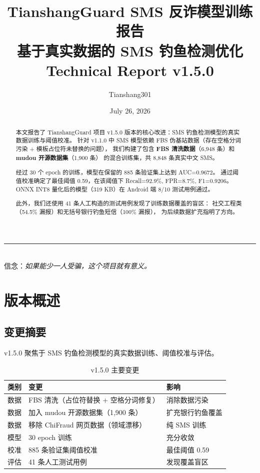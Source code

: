\documentclass[11pt,a4paper]{article}
\title{\vspace{-2cm}
  {\LARGE\bfseries\color{primaryblue} TianshangGuard SMS 反诈模型训练报告}\\[0.3cm]
  {\large 基于真实数据的 SMS 钓鱼检测优化}\\[0.2cm]
  {\normalsize Technical Report v1.5.0}
}
\author{Tianshang301}
\date{July 26, 2026}
\begin{document}
\maketitle
\thispagestyle{empty}

\begin{center}
\rule{0.618\textwidth}{0.5pt}\\[0.3cm]
{\small 信念：\textit{如果能少一人受骗，这个项目就有意义。}}
\end{center}

\vspace{0.5cm}

\begin{abstract}
本文报告了 TianshangGuard 项目 v1.5.0 版本的核心改进：SMS 钓鱼检测模型的真实数据训练与阈值校准。
针对 v1.1.0 中 SMS 模型依赖 FBS 伪基站数据（存在空格分词污染 + 模板占位符未替换的问题），
我们构建了包含 \textbf{FBS 清洗数据}（6,948 条）和 \textbf{mudou 开源数据集}（1,900 条）
的混合训练集，共 8,848 条真实中文 SMS。

经过 30 个 epoch 的训练，模型在保留的 885 条验证集上达到 AUC=0.9672。
通过阈值校准确定了最佳阈值 0.59，在该阈值下 Recall=92.9\%, FPR=8.7\%, F1=0.9206。
ONNX INT8 量化后的模型（319 KB）在 Android 端 8/10 测试用例通过。

此外，我们还使用 41 条人工构造的测试用例发现了训练数据覆盖的盲区：
社交工程类（54.5\% 漏报）和无括号银行钓鱼短信（100\% 漏报），
为后续数据扩充指明了方向。
\end{abstract}

\tableofcontents
\newpage

\section{版本概述}

\subsection{变更摘要}

v1.5.0 聚焦于 SMS 钓鱼检测模型的真实数据训练、阈值校准与评估。

\begin{table}[H]
\centering
\caption{v1.5.0 主要变更}
\begin{tabular}{lll}
\toprule
类别 & 变更 & 影响 \\
\midrule
数据 & FBS 清洗（占位符替换 + 空格分词修复） & 消除数据污染 \\
数据 & 加入 mudou 开源数据集（1,900 条） & 扩充银行钓鱼覆盖 \\
数据 & 移除 ChiFraud 网页数据（领域漂移） & 纯 SMS 训练 \\
模型 & 30 epoch 训练 & 充分收敛 \\
校准 & 885 条验证集阈值校准 & 最佳阈值 0.59 \\
评估 & 41 条人工测试用例 & 发现覆盖盲区 \\
\bottomrule
\end{tabular}
\end{table}
\end{document}
